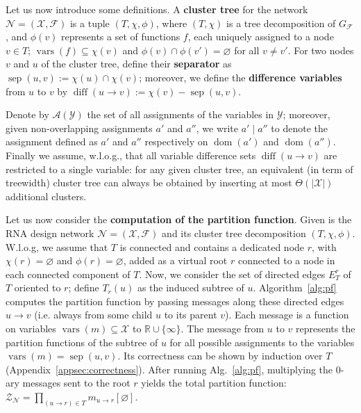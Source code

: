 \documentclass{bioinfo}
\newcommand{\network}{\mathcal{N}}
\newcommand{\dom}{\operatorname{dom}} %
\newcommand{\val}{a} %
\newcommand{\vars}{\operatorname{vars}}
\newcommand{\partfun}[1]{\mathcal{Z}_{#1}}
\newcommand{\separator}[2]{\operatorname{sep}(#1,#2)}
\newcommand{\difference}[2]{\operatorname{diff}(#1 \rightarrow #2)}
\newcommand{\real}{\mathbb{R}}
\newcommand{\assignments}{\mathcal{A}}
\newcommand{\F}{\mathcal{F}}
\newcommand{\X}{\mathcal{X}}
\newcommand{\Y}{\mathcal{Y}}
\newcommand{\edgesToR}{E^r_T}
\newcommand{\Def}[1]{{\bf #1}}
\begin{document}
%

Let us now introduce some definitions. A \Def{cluster tree} for the network $\network=(\X,\F)$ is a tuple $(T,\chi,\phi)$, where $(T,\chi)$ is a tree decomposition of $G_\F$, and $\phi(v)$ represents a set of functions $f$, each uniquely assigned to a node $v\in T$; $\vars(f)\subseteq\chi(v)$ and $\phi(v)\cap \phi(v')=\varnothing$ for all $v\neq v'$.
For two nodes $v$ and $u$ of the cluster tree, define their \Def{separator} as $\separator{u}{v} := \chi(u)\cap\chi(v)$; moreover, we define the \Def{difference variables} from $u$ to $v$ by $\difference{u}{v}:=\chi(v) - \separator{u}{v}$.

Denote by $\assignments(\Y)$ the set of all assignments of the variables in $\Y$; moreover, given non-overlapping assignments $\val'$ and $\val''$, we write $\val'\mid\val''$ to denote the assignment defined as $\val'$ and $\val''$ respectively on $\dom(\val')$ and $\dom(\val'')$. 
Finally we assume, w.l.o.g., that all variable difference sets $\difference{u}{v}$ are restricted to a single variable: for any given cluster tree, an equivalent (in term of treewidth) cluster tree can always be obtained by inserting at most $\Theta(|\X|)$ additional clusters.

Let us now consider the \Def{computation of the partition function}.
Given is the RNA design network $\network=(\X,\F)$ and its cluster
tree decomposition $(T,\chi,\phi)$.  W.l.o.g, we assume that $T$ is
connected and contains a dedicated node $r$, with $\chi(r)=\varnothing$
and $\phi(r)=\varnothing$, added as a virtual root
$r$ connected to a node in each connected
component of $T$.  Now, we consider the set of directed edges
$\edgesToR{}$ of $T$ oriented to $r$; define $T_r(u)$ as the induced
subtree of $u$. Algorithm~\ref{alg:pf} computes the partition function by
passing messages along these directed edges $u\to v$ (i.e. always from
some child $u$ to its parent $v$). Each message is a function on
variables $\vars(m)\subseteq \X$ to $\real\cup\{\infty\}$. The message
from $u$ to $v$ represents the partition functions of the subtree of
$u$ for all possible assignments to the variables
$\vars(m)=\separator{u}{v}$. Its correctness can be shown by induction over $T$ (Appendix~\ref{appsec:correctness}).
After running Alg.~\ref{alg:pf}, 
multiplying the 0-ary messages sent to the root $r$ yields the total partition function:
\begin{math}
  \partfun{\network} = \prod_{(u\to r)\in T} m_{u\to r}[\varnothing].
\end{math}
\end{document}
